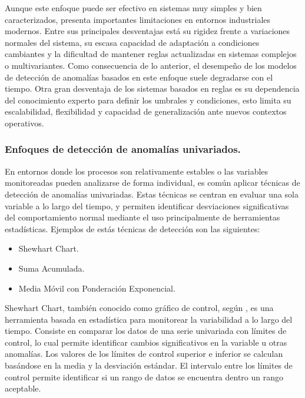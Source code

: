 \documentclass[11pt,a4paper,spanish]{book}
\numberwithin{equation}{chapter}
\numberwithin{figure}{chapter}
\begin{document}
Aunque este enfoque puede ser efectivo en sistemas muy simples y bien caracterizados, 
presenta importantes limitaciones en entornos industriales modernos. 
Entre sus principales desventajas está su rigidez frente a variaciones normales del 
sistema, su escasa capacidad de adaptación a condiciones cambiantes y la dificultad 
de mantener reglas actualizadas en sistemas complejos o multivariantes. 
Como consecuencia de lo anterior, el desempeño de los modelos de detección de 
anomalías basados en este enfoque suele degradarse con el tiempo. 
Otra gran desventaja de los sistemas basados en reglas es su dependencia del 
conocimiento experto para definir los umbrales y condiciones, esto limita su 
escalabilidad, flexibilidad y capacidad de generalización ante nuevos contextos 
operativos.

\subsubsection{Enfoques de detección de anomalías univariados.}

En entornos donde los procesos son relativamente estables o las variables monitoreadas 
pueden analizarse de forma individual, es común aplicar técnicas de detección de 
anomalías univariadas. 
Estas técnicas se centran en evaluar una sola variable a lo largo del tiempo, y 
permiten identificar desviaciones significativas del comportamiento normal mediante el 
uso principalmente de herramientas estadísticas. Ejemplos de estás técnicas de 
detección son las siguientes: 

\begin{itemize}
	\item Shewhart Chart.
	\item Suma Acumulada.
	\item Media Móvil con Ponderación Exponencial.
\end{itemize}

Shewhart Chart, también conocido como gráfico de control, según \cite{chen1998shewhart}, es una herramienta basada en estadística para monitorear la variabilidad a lo largo del tiempo. Consiste en comparar los datos de una serie univariada con límites de control, lo cual permite identificar cambios significativos en la variable u otras anomalías. Los valores de los límites de control superior e inferior se calculan basándose en la media y la desviación estándar. El intervalo entre los límites de control permite identificar si un rango de datos se encuentra dentro un rango aceptable. 
\end{document}
